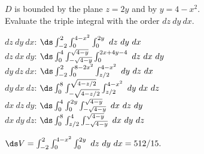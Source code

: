 {\label{13_06_ex_12}$D$ is bounded by the plane $z=2y$ and by $y=4-x^2$.\\

Evaluate the triple integral with the order $dz\ dy\ dx$.

}
{$dz\ dy\ dx$: $\ds\int_{-2}^2\int_{0}^{4-x^2}\int_{0}^{2y}\ dz\ dy\ dx$\\
	$dz\ dx\ dy$: $\ds\int_{0}^4\int_{-\sqrt{4-y}}^{\sqrt{4-y}}\int_{0}^{2x+4y-4}\ dz\ dx\ dy$\\
	$dy\ dz\ dx$: $\ds\int_{-2}^2\int_0^{8-2x^2}\int_{z/2}^{4-x^2}\ dy\ dz\ dx$\\
	$dy\ dx\ dz$: $\ds\int_0^8\int_{-\sqrt{4-z/2}}^{\sqrt{4-z/2}}\int_{z/2}^{4-x^2}\ dy\ dx\ dz$\\
	$dx\ dz\ dy$: $\ds\int_{0}^4\int_{0}^{2y}\int_{-\sqrt{4-y}}^{\sqrt{4-y}}\ dx\ dz\ dy$\\
	$dx\ dy\ dz$: $\ds\int_0^8\int_{z/2}^{4}\int_{-\sqrt{4-y}}^{\sqrt{4-y}}\ dx\ dy\ dz$
	
	$\ds V = \int_{-2}^2\int_{0}^{4-x^2}\int_{0}^{2y}\ dz\ dy\ dx = 512/15.$
}
